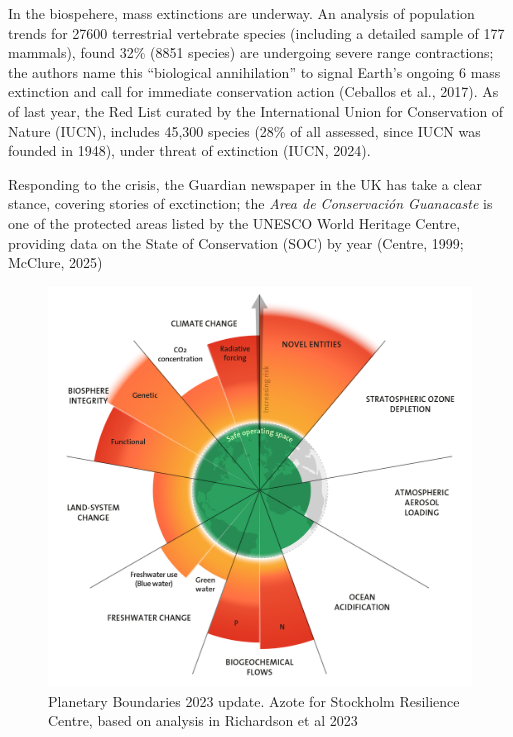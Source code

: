 \documentclass[
  12pt,
  letterpaper,
  DIV=11,
  numbers=noendperiod]{scrartcl}
\begin{document}
In the biospehere, mass extinctions are underway. An analysis of
population trends for 27600 terrestrial vertebrate species (including a
detailed sample of 177 mammals), found 32\% (8851 species) are
undergoing severe range contractions; the authors name this ``biological
annihilation'' to signal Earth's ongoing 6 mass extinction and call for
immediate conservation action (Ceballos et al., 2017). As of last year,
the Red List curated by the International Union for Conservation of
Nature (IUCN), includes 45,300 species (28\% of all assessed, since IUCN
was founded in 1948), under threat of extinction (IUCN, 2024).

Responding to the crisis, the Guardian newspaper in the UK has take a
clear stance, covering stories of exctinction; the \emph{Area de
Conservación Guanacaste} is one of the protected areas listed by the
UNESCO World Heritage Centre, providing data on the State of
Conservation (SOC) by year (Centre, 1999; McClure, 2025)

\begin{figure}

{\centering \includegraphics[width=1\linewidth,height=\textheight,keepaspectratio]{./images/sustainability/planetary-boundaries-2023.png}

}

\caption[Planetary Boundaries 2023 Update]{Planetary Boundaries 2023
update. Azote for Stockholm Resilience Centre, based on analysis in
Richardson et al 2023}

\end{figure}%
\end{document}
